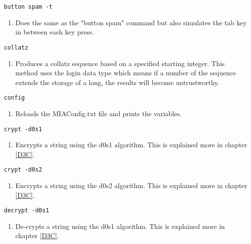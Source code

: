 \index{}
\begin{lstlisting} 
button spam -t
\end{lstlisting}
\begin{enumerate}
	\item[] Does the same as the "button spam" command but also simulates the tab key in between each key press.
\end{enumerate}

\begin{lstlisting} 
collatz   
\end{lstlisting}
\begin{enumerate}
	\item[] Produces a collatz sequence based on a specified starting integer. This method uses the login data type which means if a number of the sequence extends the storage of a long, the results will become untrustworthy. 
\end{enumerate}
\begin{lstlisting} 
config 
\end{lstlisting}
\begin{enumerate}
	\item[] Reloads the MIAConfig.txt file and prints the variables.
\end{enumerate}

\begin{lstlisting} 
crypt -d0s1   
\end{lstlisting}
\begin{enumerate}
	\item[] Encrypts a string using the d0s1 algorithm. This is explained more in chapter \ref{D3C}.
\end{enumerate}

\begin{lstlisting} 
crypt -d0s2  
\end{lstlisting}
\begin{enumerate}
	\item[] Encrypts a string using the d0s2 algorithm. This is explained more in chapter \ref{D3C}.
\end{enumerate}

\begin{lstlisting} 
decrypt -d0s1   
\end{lstlisting}
\begin{enumerate}
	\item[] De-crypts a string using the d0s1 algorithm. This is explained more in chapter \ref{D3C}.
\end{enumerate}


